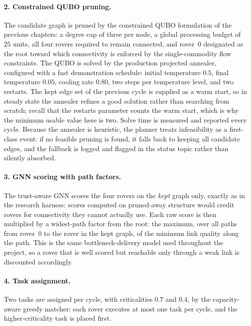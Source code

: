 \paragraph{2. Constrained QUBO pruning.}
The candidate graph is pruned by the constrained QUBO formulation of the
previous chapters: a degree cap of three per node, a global processing
budget of $25$ units, all four rovers required to remain connected, and
rover~0 designated as the root toward which connectivity is enforced by
the single-commodity flow constraints. The QUBO is solved by the
production projected annealer, configured with a fast demonstration
schedule: initial temperature $0.5$, final temperature $0.05$, cooling
rate $0.80$, two steps per temperature level, and two restarts. The kept
edge set of the previous cycle is supplied as a warm start, so in steady
state the annealer refines a good solution rather than searching from
scratch; recall that the restarts parameter counts the warm start, which
is why the minimum usable value here is two. Solve time is measured and
reported every cycle. Because the annealer is heuristic, the planner
treats infeasibility as a first-class event: if no feasible pruning is
found, it falls back to keeping all candidate edges, and the fallback is
logged and flagged in the status topic rather than silently absorbed.

\paragraph{3. GNN scoring with path factors.}
The trust-aware GNN scores the four rovers on the \emph{kept} graph
only, exactly as in the research harness: scores computed on pruned-away
structure would credit rovers for connectivity they cannot actually use.
Each raw score is then multiplied by a widest-path factor from the root:
the maximum, over all paths from rover~0 to the rover in the kept graph,
of the minimum link quality along the path. This is the same
bottleneck-delivery model used throughout the project, so a rover that
is well scored but reachable only through a weak link is discounted
accordingly.

\paragraph{4. Task assignment.}
Two tasks are assigned per cycle, with criticalities $0.7$ and $0.4$,
by the capacity-aware greedy matcher: each rover executes at most one
task per cycle, and the higher-criticality task is placed first.

